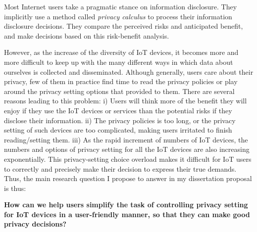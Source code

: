 Most Internet users take a pragmatic stance on information disclosure. They implicitly use a method called \textit{privacy calculus} to process their information disclosure decisions. They compare the perceived risks and anticipated benefit, and make decisions based on this risk-benefit analysis.

However, as the increase of the diversity of IoT devices, it becomes more and more difficult to keep up with the many different ways in which data about ourselves is collected and disseminated. Although generally, users care about their privacy, few of them in practice find time to read the privacy policies or play around the privacy setting options that provided to them. There are several reasons leading to this problem: i) Users will think more of the benefit they will enjoy if they use the IoT devices or services than the potential risks if they disclose their information. ii) The privacy policies is too long, or the privacy setting of such devices are too complicated, making users irritated to finish reading/setting them. iii) As the rapid increment of numbers of IoT devices, the numbers and options of privacy setting for all the IoT devices are also increasing exponentially. This privacy-setting choice overload makes it difficult for IoT users to correctly and precisely make their decision to express their true demands. Thus, the main research question I propose to answer in my dissertation proposal is thus:

\textbf{How can we help users simplify the task of controlling privacy setting for IoT devices in a user-friendly manner, so that they can make good privacy decisions?}